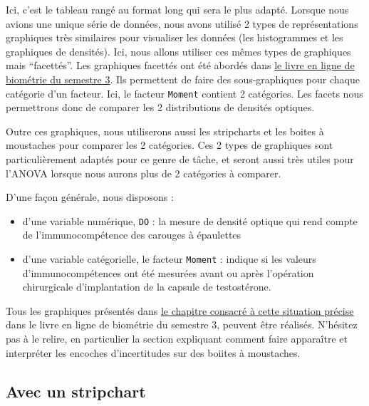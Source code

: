 \documentclass[
  french,
  a4paper,
  DIV=11,
  numbers=noendperiod,
  oneside]{scrreprt}
\providecommand{\tightlist}{%
  \setlength{\itemsep}{0pt}\setlength{\parskip}{0pt}}
\begin{document}
Ici, c'est le tableau rangé au format long qui sera le plus adapté.
Lorsque nous avions une unique série de données, nous avons utilisé 2
types de représentations graphiques très similaires pour visualiser les
données (les histogrammes et les graphiques de densités). Ici, nous
allons utiliser ces mêmes types de graphiques mais ``facettés''. Les
graphiques facettés ont été abordés dans
\href{https://besibo.github.io/BiometrieS3/03-visualization.html\#diagrammes-bâtons-facettés}{le
livre en ligne de biométrie du semestre 3}. Ils permettent de faire des
sous-graphiques pour chaque catégorie d'un facteur. Ici, le facteur
\texttt{Moment} contient 2 catégories. Les facets nous permettrons donc
de comparer les 2 distributions de densités optiques.

Outre ces graphiques, nous utiliserons aussi les stripcharts et les
boites à moustaches pour comparer les 2 catégories. Ces 2 types de
graphiques sont particulièrement adaptés pour ce genre de tâche, et
seront aussi très utiles pour l'ANOVA lorsque nous aurons plus de 2
catégories à comparer.

D'une façon générale, nous disposons :

\begin{itemize}
\tightlist
\item
  d'une variable numérique, \texttt{DO} : la mesure de densité optique
  qui rend compte de l'immunocompétence des carouges à épaulettes
\item
  d'une variable catégorielle, le facteur \texttt{Moment} : indique si
  les valeurs d'immunocompétences ont été mesurées avant ou après
  l'opération chirurgicale d'implantation de la capsule de testostérone.
\end{itemize}

Tous les graphiques présentés dans
\href{https://besibo.github.io/BiometrieS3/03-visualization.html\#une-variable-de-chaque-type}{le
chapitre consacré à cette situation précise} dans le livre en ligne de
biométrie du semestre 3, peuvent être réalisés. N'hésitez pas à le
relire, en particulier la section expliquant comment faire apparaître et
interpréter les encoches d'incertitudes sur des boiites à moustaches.

\subsection{Avec un stripchart}\label{avec-un-stripchart}
\end{document}
